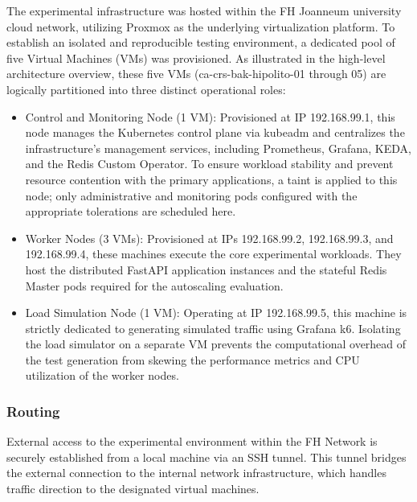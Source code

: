     The experimental infrastructure was hosted within the FH Joanneum university cloud network, utilizing Proxmox as the underlying virtualization platform. To establish an isolated and reproducible testing environment, a dedicated pool of five Virtual Machines (VMs) was provisioned.
    As illustrated in the high-level architecture overview, these five VMs (ca-crs-bak-hipolito-01 through 05) are logically partitioned into three distinct operational roles:
    \begin{itemize}
        \item Control and Monitoring Node (1 VM): Provisioned at IP 192.168.99.1, this node manages the Kubernetes control plane via kubeadm and centralizes the infrastructure's management services, including Prometheus, Grafana, KEDA, and the Redis Custom Operator. To ensure workload stability and prevent resource contention with the primary applications, a taint is applied to this node; only administrative and monitoring pods configured with the appropriate tolerations are scheduled here.

        \item Worker Nodes (3 VMs): Provisioned at IPs 192.168.99.2, 192.168.99.3, and 192.168.99.4, these machines execute the core experimental workloads. They host the distributed FastAPI application instances and the stateful Redis Master pods required for the autoscaling evaluation.

        \item Load Simulation Node (1 VM): Operating at IP 192.168.99.5, this machine is strictly dedicated to generating simulated traffic using Grafana k6. Isolating the load simulator on a separate VM prevents the computational overhead of the test generation from skewing the performance metrics and CPU utilization of the worker nodes.   
     
    \end{itemize}

\subsubsection{Routing}
\label{subsubsec:routing}

    External access to the experimental environment within the FH Network is securely established from a local machine via an SSH tunnel. This tunnel bridges the external connection to the internal network infrastructure, which handles traffic direction to the designated virtual machines. 
    
